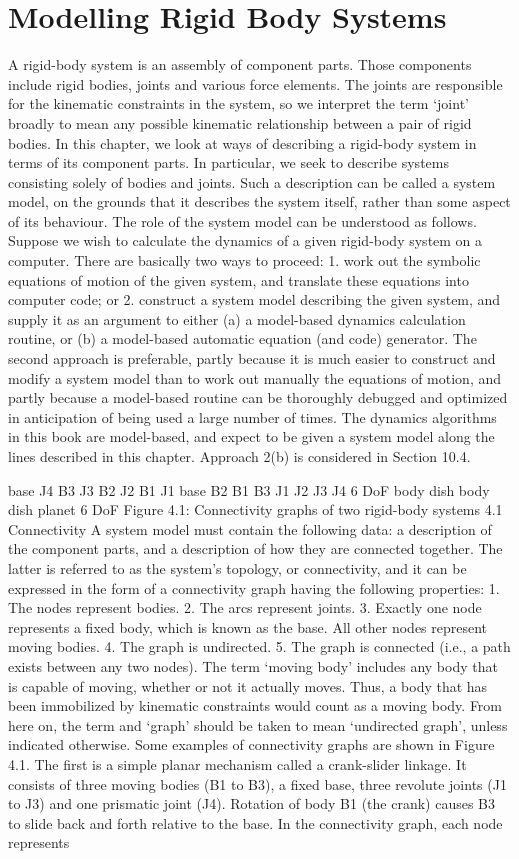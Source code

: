 \chapter{Modelling Rigid Body Systems}
\label{chap:4}
A rigid-body system is an assembly of component parts. Those components include rigid bodies, joints and various force elements. The joints are responsible for the kinematic constraints in the system, so we interpret the term ‘joint’ broadly to mean any possible kinematic relationship between a pair of rigid bodies. In this chapter, we look at ways of describing a rigid-body system in terms of its component parts. In particular, we seek to describe systems consisting solely of bodies and joints. Such a description can be called a system model, on the grounds that it describes the system itself, rather than some aspect of its behaviour. The role of the system model can be understood as follows. Suppose we wish to calculate the dynamics of a given rigid-body system on a computer. There are basically two ways to proceed: 1. work out the symbolic equations of motion of the given system, and translate these equations into computer code; or 2. construct a system model describing the given system, and supply it as an argument to either (a) a model-based dynamics calculation routine, or (b) a model-based automatic equation (and code) generator. The second approach is preferable, partly because it is much easier to construct and modify a system model than to work out manually the equations of motion, and partly because a model-based routine can be thoroughly debugged and optimized in anticipation of being used a large number of times. The dynamics algorithms in this book are model-based, and expect to be given a system model along the lines described in this chapter. Approach 2(b) is considered in Section 10.4.

base J4 B3 J3 B2 J2 B1 J1 base B2 B1 B3 J1 J2 J3 J4 6 DoF body dish body dish planet 6 DoF Figure 4.1: Connectivity graphs of two rigid-body systems 4.1 Connectivity A system model must contain the following data: a description of the component parts, and a description of how they are connected together. The latter is referred to as the system’s topology, or connectivity, and it can be expressed in the form of a connectivity graph having the following properties: 1. The nodes represent bodies. 2. The arcs represent joints. 3. Exactly one node represents a fixed body, which is known as the base. All other nodes represent moving bodies. 4. The graph is undirected. 5. The graph is connected (i.e., a path exists between any two nodes). The term ‘moving body’ includes any body that is capable of moving, whether or not it actually moves. Thus, a body that has been immobilized by kinematic constraints would count as a moving body. From here on, the term and ‘graph’ should be taken to mean ‘undirected graph’, unless indicated otherwise. Some examples of connectivity graphs are shown in Figure 4.1. The first is a simple planar mechanism called a crank-slider linkage. It consists of three moving bodies (B1 to B3), a fixed base, three revolute joints (J1 to J3) and one prismatic joint (J4). Rotation of body B1 (the crank) causes B3 to slide back and forth relative to the base. In the connectivity graph, each node represents

